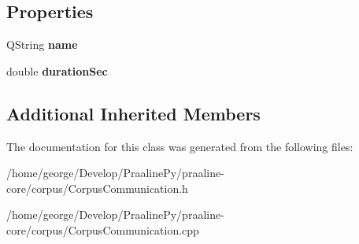 \subsection*{Properties}
\begin{DoxyCompactItemize}
\item 
\mbox{\label{class_corpus_communication_a1aeb5434de9c329b027618f77d707acf}} 
Q\+String {\bfseries name}
\item 
\mbox{\label{class_corpus_communication_a6e73b451bd9c76270e2de6294103bc6b}} 
double {\bfseries duration\+Sec}
\end{DoxyCompactItemize}
\subsection*{Additional Inherited Members}


The documentation for this class was generated from the following files\+:\begin{DoxyCompactItemize}
\item 
/home/george/\+Develop/\+Praaline\+Py/praaline-\/core/corpus/Corpus\+Communication.\+h\item 
/home/george/\+Develop/\+Praaline\+Py/praaline-\/core/corpus/Corpus\+Communication.\+cpp\end{DoxyCompactItemize}

